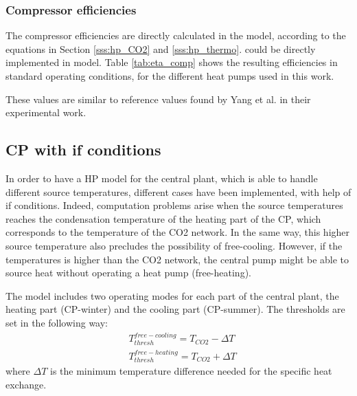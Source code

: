\documentclass{article}
\begin{document}
\subsubsection{Compressor efficiencies}
The compressor efficiencies are directly calculated in the model, according to the equations in Section \ref{sss:hp_CO2} and \ref{sss:hp_thermo}. could be directly implemented in model. Table \ref{tab:eta_comp} shows the resulting efficiencies in standard operating conditions, for the different heat pumps used in this work.



These values are similar to reference values found by Yang et al.\cite{yangTheoreticalExperimentalInvestigation2016} in their experimental work.



\subsection{CP with if conditions}
In order to have a HP model for the central plant, which is able to handle different source temperatures, different cases have been implemented, with help of if conditions. Indeed, computation problems arise when the source temperatures reaches the condensation temperature of the heating part of the CP, which corresponds to the temperature of the CO2 network. In the same way, this higher source temperature also precludes the possibility of free-cooling. However, if the temperatures is higher than the CO2 network, the central pump might be able to source heat without operating a heat pump (free-heating).

The model includes two operating modes for each part of the central plant, the heating part (CP-winter) and the cooling part (CP-summer). The thresholds are set in the following way:
\begin{align}
	& T_{thresh}^{free-cooling} = T_{CO2} - \Delta T \\
	& T_{thresh}^{free-heating} = T_{CO2} + \Delta T 
\end{align}
where $\Delta T$ is the minimum temperature difference needed for the specific heat exchange.
\end{document}
